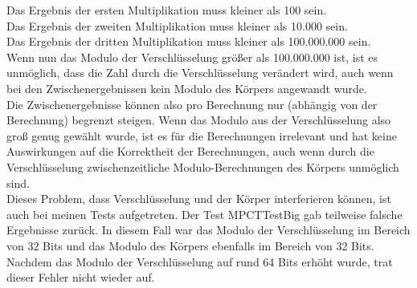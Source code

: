 Das Ergebnis der ersten Multiplikation muss kleiner als 100 sein.\\
Das Ergebnis der zweiten Multiplikation muss kleiner als 10.000 sein.\\
Das Ergebnis der dritten Multiplikation muss kleiner als 100.000.000 sein.\\
Wenn nun das Modulo der Verschlüsselung größer als 100.000.000 ist, ist es unmöglich, dass die Zahl durch die Verschlüsselung verändert wird, auch wenn bei den Zwischenergebnissen kein Modulo des Körpers angewandt wurde.\\
Die Zwischenergebnisse können also pro Berechnung nur (abhängig von der Berechnung) begrenzt steigen.
Wenn das Modulo aus der Verschlüsselung also groß genug gewählt wurde, ist es für die Berechnungen irrelevant und hat keine Auswirkungen auf die Korrektheit der Berechnungen, auch wenn durch die Verschlüsselung zwischenzeitliche Modulo-Berechnungen des Körpers unmöglich sind.\\
Dieses Problem, dass Verschlüsselung und der Körper interferieren können, ist auch bei meinen Tests aufgetreten. Der Test MPCTTestBig gab teilweise falsche Ergebnisse zurück. In diesem Fall war das Modulo der Verschlüsselung im Bereich von 32 Bits und das Modulo des Körpers ebenfalls im Bereich von 32 Bits. Nachdem das Modulo der Verschlüsselung auf rund 64 Bits erhöht wurde, trat dieser Fehler nicht wieder auf.\\